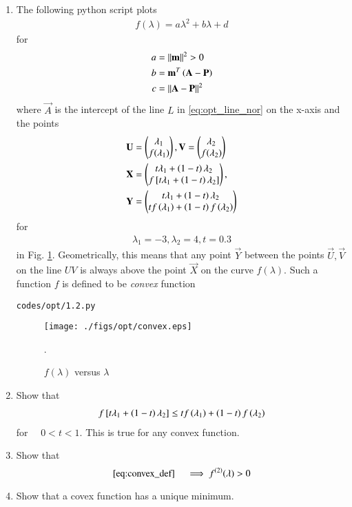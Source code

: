 \renewcommand{\theequation}{\theenumi}

\begin{enumerate}[label=\arabic*.,ref=\thesection.\theenumi]

\item
The following python script plots 
%
\begin{align}
f(\lambda) = a\lambda^2 + b\lambda + d
\label{eq:opt_parab}
\end{align}
%
for 
\begin{align}
a &= \left\lVert\mathbf{m}\right\rVert^2 > 0
\\
b &= \mathbf{m}^T\left(\mathbf{A} -\mathbf{P}\right) 
\\
c &= \left\lVert\mathbf{A} -\mathbf{P}\right\rVert^2
\end{align}
where $\vec{A}$ is the intercept of the line $L$ in \eqref{eq:opt_line_nor}
on the x-axis and the points
\begin{align}
\mathbf{U} &= \begin{pmatrix}\lambda_1\\f(\lambda_1)\end{pmatrix}, 
\mathbf{V} = \begin{pmatrix}\lambda_2\\f(\lambda_2)\end{pmatrix}
\\
\mathbf{X} &= \begin{pmatrix}t \lambda_1 + \left(1-t\right)\lambda_2 \\ f{}\left[t \lambda_1 + \left(1-t\right)\lambda_2\right]\end{pmatrix},
\\
\mathbf{Y} &= \begin{pmatrix}t \lambda_1 + \left(1-t\right)\lambda_2 \\ t f\left(\lambda_1\right) + \left(1-t\right)f\left(\lambda_2\right)\end{pmatrix}
\end{align}
%
for 
\begin{align}
\lambda_1 = -3, 
\lambda_2 = 4, 
t = 0.3
\end{align}
in Fig. \ref{fig:conv_def}. Geometrically, this means that any point $\vec{Y}$ between the points $\vec{U}, \vec{V}$ on the line $UV$ is always above the point $\vec{X}$ on the curve $f(\lambda)$.
Such a  function $f$ is defined to be {\em convex} function 
%
\begin{lstlisting}
codes/opt/1.2.py
\end{lstlisting}
%
\begin{figure}[!ht]
\centering
\texttt{[image: ./figs/opt/convex.eps]}
\caption{ $f(\lambda)$ versus $\lambda$}.
\label{fig:conv_def}	
\end{figure}
%
\item Show that
%
\begin{align}
\label{eq:convex_def}
f{}\left[t \lambda_1 + \left(1-t\right)\lambda_2\right] \leq 
t f\left(\lambda_1\right) + \left(1-t\right)f\left(\lambda_2\right)
\end{align}
%
for $\quad 0 < t < 1$.  This is true for any convex function.
%
\item Show that 
%
\begin{equation}
\eqref{eq:convex_def} \quad \implies f^{(2)}(\lambda) > 0
\end{equation}
%
\item Show that a covex function has a unique minimum.
%
\end{enumerate}
%
